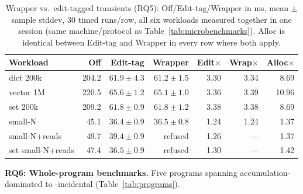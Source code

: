 \documentclass[sigplan,review,anonymous]{acmart}
\begin{document}
\begin{table}[h]
  \caption{Wrapper vs.\ edit-tagged transients (RQ5): Off/Edit-tag/Wrapper in ms, mean $\pm$ sample stddev, 30 timed runs/row, all six workloads measured together in one session (same machine/protocol as Table~\ref{tab:microbenchmarks}). Alloc is identical between Edit-tag and Wrapper in every row where both apply.}
  \label{tab:rq5-ablation}
  \footnotesize
  \setlength{\tabcolsep}{2.3pt}
  \begin{tabular}{@{}lrrrrrr@{}}
    \toprule
    Workload & Off & Edit-tag & Wrapper & Edit$\times$ & Wrap$\times$ & Alloc$\times$ \\
    \midrule
    dict 200k      & 204.2 & $61.9\pm4.3$ & $61.2\pm1.5$ & 3.30 & 3.34 & 8.69 \\
    vector 1M      & 220.5 & $65.6\pm1.2$ & $65.1\pm1.0$ & 3.36 & 3.39 & 10.96 \\
    set 200k       & 209.2 & $61.8\pm0.9$ & $61.8\pm1.2$ & 3.38 & 3.38 & 8.69 \\
    small-N        & 45.1  & $36.4\pm0.9$ & $36.5\pm0.8$ & 1.24 & 1.24 & 1.37 \\
    small-N+reads  & 49.7  & $39.4\pm0.9$ & refused      & 1.26 & ---  & 1.37 \\
    set small-N+reads & 47.4 & $36.5\pm0.9$ & refused   & 1.30 & ---  & 1.42 \\
  \bottomrule
\end{tabular}
\end{table}

\textbf{RQ6: Whole-program benchmarks.} Five programs spanning accumulation-dominated to -incidental (Table~\ref{tab:programs}).
\end{document}

